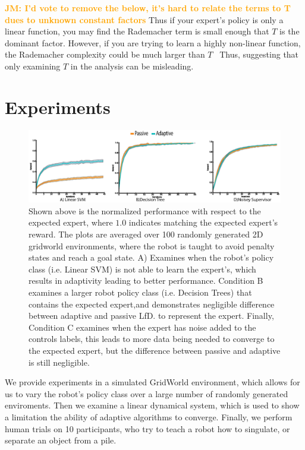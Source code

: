 \documentclass[10pt, conference]{ieeeconf}      %
\newcommand{\jmnote}[1]{\ifthenelse{ \boolean{include-notes}}%
 {\textcolor{orange}{\textbf{JM: #1}}}{}}
\begin{document}
\jmnote{I'd vote to remove the below, it's hard to relate the terms to T dues to unknown constant factors}
Thus if your expert's policy is only a linear function, you may find the Rademacher term is small enough that $T$ is the dominant factor. However, if you are trying to learn a highly non-linear function, the Rademacher complexity could be much larger than $T$~\cite{vapnik2013nature} Thus, suggesting that only examining $T$ in the analysis can be misleading. 


\section{Experiments}

\begin{figure}
\includegraphics{f_figs/var_grid.eps}
\caption{
    \footnotesize
Shown above is the normalized performance with respect to the expected expert, where $1.0$ indicates matching the expected expert's reward. The plots are averaged over 100 randomly generated 2D gridworld environments,  where the robot is taught to avoid penalty states and reach a goal state. A) Examines when the robot's policy class (i.e. Linear SVM) is not able to learn the expert's, which results in adaptivity leading to better performance. Condition B examines a larger robot policy class (i.e. Decision Trees) that contains the expected expert,and demonstrates negligible difference between adaptive and passive LfD.  to represent the expert.  Finally, Condition C examines when the expert has noise added to the controls labels, this leads to more data being needed to converge to the expected expert, but the difference between passive and adaptive is still negligible.   }
\vspace*{-20pt}
\label{fig:var}
\end{figure}

We provide experiments in a simulated GridWorld environment, which allows for us to vary the robot's policy class over a large number of randomly generated enviroments. Then we examine a linear dynamical system, which is used to show a limitation the ability of adaptive algorithms to converge. Finally, we perform human trials on 10 participants, who try to teach a robot how to singulate, or separate an object from a pile. 
\end{document}
